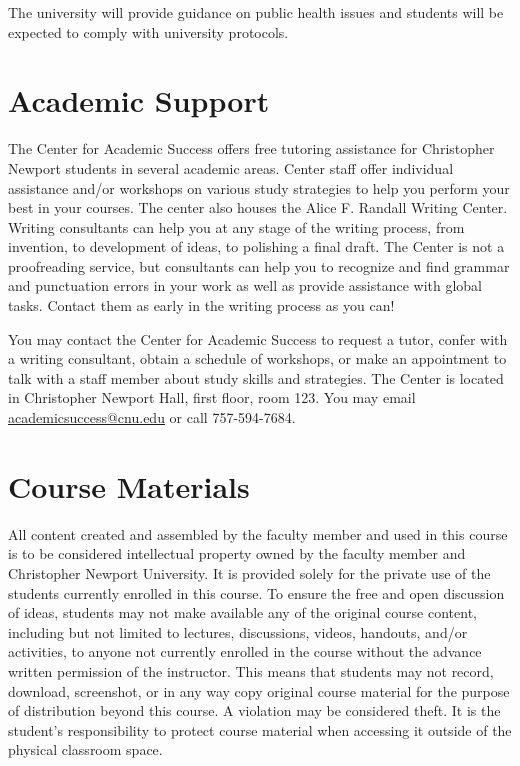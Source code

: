 \documentclass[11pt]{article}
\begin{document}
The university will provide guidance on public health issues and students will be expected to comply with university protocols.

\section{Academic Support}

The Center for Academic Success offers free tutoring assistance for Christopher Newport students in several academic areas. Center staff offer individual assistance and/or workshops on various study strategies to help you perform your best in your courses. The center also houses the Alice F. Randall Writing Center. Writing consultants can help you at any stage of the writing process, from invention, to development of ideas, to polishing a final draft. The Center is not a proofreading service, but consultants can help you to recognize and find grammar and punctuation errors in your work as well as provide assistance with global tasks. Contact them as early in the writing process as you can!

You may contact the Center for Academic Success to request a tutor, confer with a writing consultant, obtain a schedule of workshops, or make an appointment to talk with a staff member about study skills and strategies. The Center is located in Christopher Newport Hall, first floor, room 123. You may email \href{mailto:academicsuccess@cnu.edu}{academicsuccess@cnu.edu} or call 757-594-7684.

\section{Course Materials}

All content created and assembled by the faculty member and used in this course is to be considered intellectual property owned by the faculty member and Christopher Newport University. It is provided solely for the private use of the students currently enrolled in this course. To ensure the free and open discussion of ideas, students may not make available any of the original course content, including but not limited to lectures, discussions, videos, handouts, and/or activities, to anyone not currently enrolled in the course without the advance written permission of the instructor. This means that students may not record, download, screenshot, or in any way copy original course material for the purpose of distribution beyond this course. A violation may be considered theft. It is the student's responsibility to protect course material when accessing it outside of the physical classroom space.
\end{document}
